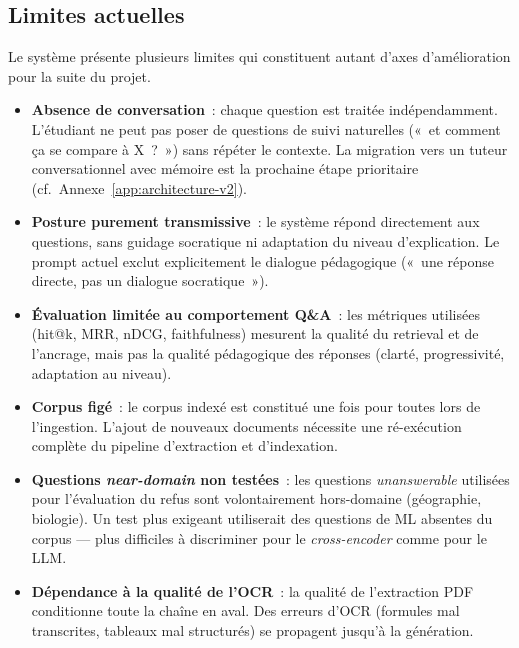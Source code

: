 \documentclass[11pt,a4paper]{article}
\begin{document}
\subsection{Limites actuelles}

Le système présente plusieurs limites qui constituent autant d'axes d'amélioration pour la suite du projet.

\begin{itemize}
  \item \textbf{Absence de conversation}~: chaque question est traitée indépendamment. L'étudiant ne peut pas poser de questions de suivi naturelles («~et comment ça se compare à X~?~») sans répéter le contexte. La migration vers un tuteur conversationnel avec mémoire est la prochaine étape prioritaire (cf.~Annexe~\ref{app:architecture-v2}).

  \item \textbf{Posture purement transmissive}~: le système répond directement aux questions, sans guidage socratique ni adaptation du niveau d'explication. Le prompt actuel exclut explicitement le dialogue pédagogique («~une réponse directe, pas un dialogue socratique~»).

  \item \textbf{Évaluation limitée au comportement Q\&A}~: les métriques utilisées (hit@k, MRR, nDCG, faithfulness) mesurent la qualité du retrieval et de l'ancrage, mais pas la qualité pédagogique des réponses (clarté, progressivité, adaptation au niveau).

  \item \textbf{Corpus figé}~: le corpus indexé est constitué une fois pour toutes lors de l'ingestion. L'ajout de nouveaux documents nécessite une ré-exécution complète du pipeline d'extraction et d'indexation.

  \item \textbf{Questions \textit{near-domain} non testées}~: les questions \textit{unanswerable} utilisées pour l'évaluation du refus sont volontairement hors-domaine (géographie, biologie). Un test plus exigeant utiliserait des questions de ML absentes du corpus --- plus difficiles à discriminer pour le \textit{cross-encoder} comme pour le LLM.

  \item \textbf{Dépendance à la qualité de l'OCR}~: la qualité de l'extraction PDF conditionne toute la chaîne en aval. Des erreurs d'OCR (formules mal transcrites, tableaux mal structurés) se propagent jusqu'à la génération.
\end{itemize}
\end{document}
